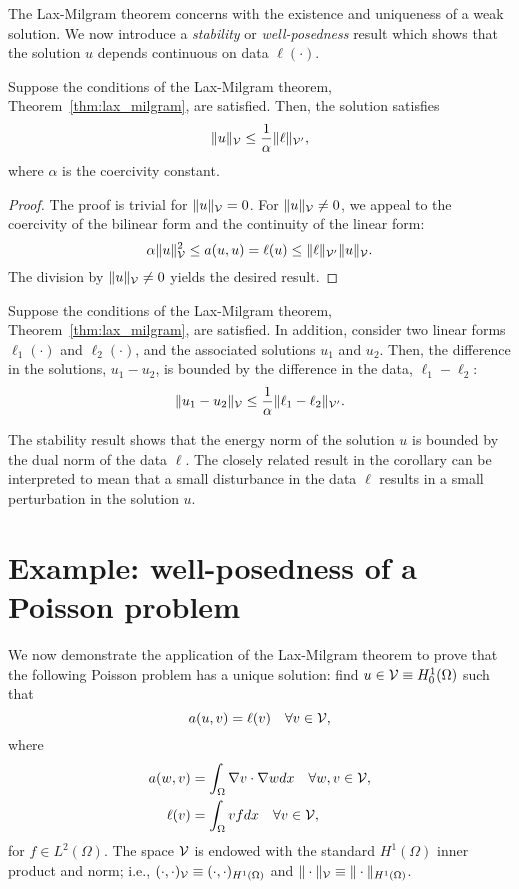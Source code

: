 The Lax-Milgram theorem concerns with the existence and uniqueness of a weak solution.  We now introduce a \emph{stability} or \emph{well-posedness} result which shows that the solution $u$ depends continuous on data $\ell(\cdot)$.
\begin{proposition}[stability]
  Suppose the conditions of the Lax-Milgram theorem, Theorem~\ref{thm:lax_milgram}, are satisfied. Then, the solution satisfies
  \begin{equation*}
    \| u \|_{\mathcal{V}} \leq \frac{1}{\alpha} \| \ell \|_{\mathcal{V}'},
  \end{equation*}
  where $\alpha$ is the coercivity constant.
  \begin{proof}
    The proof is trivial for $\| u \|_{\mathcal{V}} = 0$. For $\| u \|_{\mathcal{V}} \neq 0$, we appeal to the coercivity of the bilinear form and the continuity of the linear form:
    \begin{equation*}
      \alpha \| u \|_{\mathcal{V}}^2 \leq a(u,u) = \ell(u) \leq \| \ell \|_{\mathcal{V}'} \| u \|_{\mathcal{V}}.
    \end{equation*}
    The division by $\| u \|_{\mathcal{V}} \neq 0$ yields the desired result.
  \end{proof}
\end{proposition}
\begin{corollary}
  Suppose the conditions of the Lax-Milgram theorem, Theorem~\ref{thm:lax_milgram}, are satisfied.  In addition, consider two linear forms $\ell_1(\cdot)$ and $\ell_2(\cdot)$, and the associated solutions $u_1$ and $u_2$.  Then, the difference in the solutions, $u_1 - u_2$, is bounded by the difference in the data, $\ell_1 - \ell_2$:
  \begin{equation*}
    \| u_1 - u_2 \|_{\mathcal{V}} \leq \frac{1}{\alpha} \| \ell_1 - \ell_2 \|_{\mathcal{V}'}.
  \end{equation*}
\end{corollary}
The stability result shows that the energy norm of the solution $u$ is bounded by the dual norm of the data $\ell$.  The closely related result in the corollary can be interpreted to mean that a small disturbance in the data $\ell$ results in a small perturbation in the solution $u$.

\section{Example: well-posedness of a Poisson problem}
We now demonstrate the application of the Lax-Milgram theorem to prove that the following Poisson problem has a unique solution: find $u \in \mathcal{V} \equiv H^1_0(\Omega)$ such that
\begin{equation*}
  a(u,v) = \ell(v) \quad \forall v \in \mathcal{V},
\end{equation*}
where
\begin{align*}
  a(w,v) &= \int_\Omega \nabla v \cdot \nabla w dx \quad \forall w,v \in \mathcal{V}, \\
  \ell(v) &= \int_\Omega v f dx \quad \forall v \in \mathcal{V},
\end{align*}
for $f \in L^2(\Omega)$.  The space $\mathcal{V}$ is endowed with the standard $H^1(\Omega)$ inner product and norm; i.e., $(\cdot,\cdot)_{\mathcal{V}} \equiv (\cdot,\cdot)_{H^1(\Omega)}$ and $\| \cdot \|_{\mathcal{V}} \equiv \| \cdot \|_{H^1(\Omega)}$.

